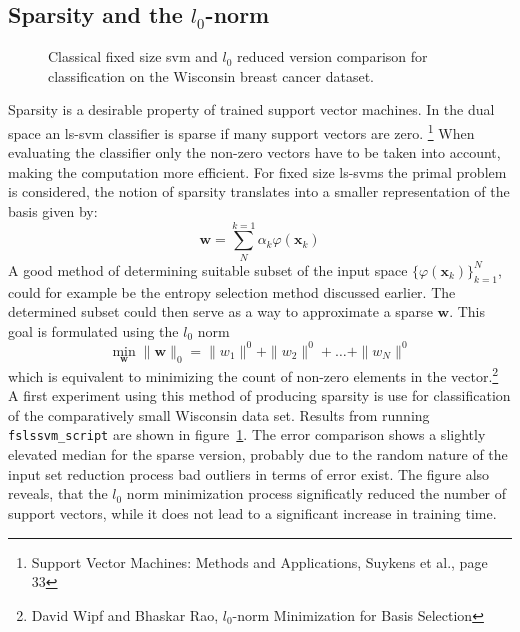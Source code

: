 \subsection{Sparsity and the $l_0$-norm}
\begin{figure}
\centering



\caption{Classical fixed size svm and $l_0$ reduced version comparison for classification on the Wisconsin breast cancer dataset.}
\label{fig:brl0}
\end{figure}
Sparsity is a desirable property of trained support vector machines. In the dual space an ls-svm classifier is sparse if many support vectors are zero. \footnote{Support Vector Machines: Methods and Applications, Suykens et al., page 33} When evaluating the classifier only the non-zero vectors have to be taken into account, making the computation more efficient. For fixed size ls-svms the primal problem is considered, the notion of sparsity translates into a smaller representation of the basis given by:
\begin{equation}
\mathbf{w} = \sum\limits_{N}^{k = 1} \alpha_k \varphi(\mathbf{x}_k)
\end{equation}
A good method of determining suitable subset of the input space $\{\varphi(\mathbf{x}_k)\}_{k = 1}^N$, could for example be the entropy selection method discussed earlier. The determined subset could then serve as a way to approximate a sparse $\mathbf{w}$. This goal is formulated using the $l_0$ norm
\begin{equation}
\min\limits_{\mathbf{w}} \| \mathbf{w} \|_0 = \|w_1 \|^0 + \|w_2 \|^0 + \dots +\|w_N \|^0 
\end{equation}
which is equivalent to minimizing the count of non-zero elements in the vector.\footnote{David Wipf and Bhaskar Rao, $l_0$-norm Minimization for Basis Selection}
A first experiment using this method of producing sparsity is use for classification of the comparatively small Wisconsin data set. Results from running \texttt{fslssvm\_script} are shown in figure~\ref{fig:brl0}. The error comparison shows a slightly elevated median for the sparse version, probably due to the random nature of the input set reduction process bad outliers in terms of error exist. The figure also reveals, that the $l_0$ norm minimization process significatly reduced the number of support vectors, while it does not lead to a significant increase in training time.


